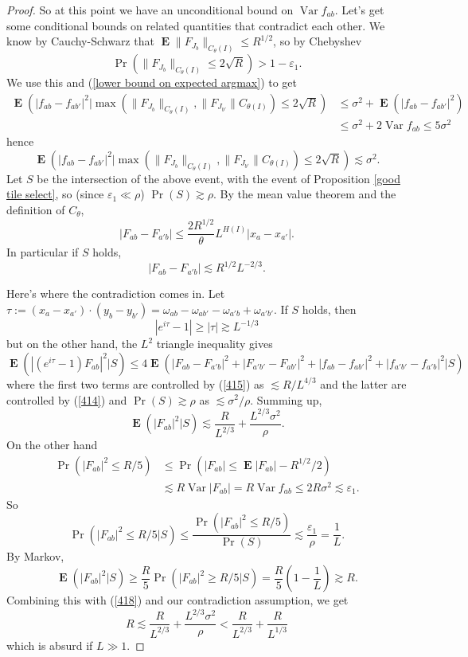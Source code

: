 \documentclass[reqno,12pt]{amsart}
\DeclareMathOperator*{\Expect}{\mathbf E}
\DeclareMathOperator{\Var}{\mathrm{Var}}
\theoremstyle{definition}
\numberwithin{equation}{section}
\begin{document}
\begin{proof}
So at this point we have an unconditional bound on $\Var f_{ab}$.
Let's get some conditional bounds on related quantities that contradict each other.
We know by Cauchy-Schwarz that $\Expect \|F_{J_b}\|_{C_\theta(I)} \leq R^{1/2}$, so by Chebyshev
$$\Pr(\|F_{J_b}\|_{C_\theta(I)} \leq 2\sqrt R) > 1 - \varepsilon_1.$$
We use this and (\ref{lower bound on expected argmax}) to get
\begin{align*}
\Expect(|f_{ab} - f_{ab'}|^2|\max(\|F_{J_b}\|_{C_\theta(I)}, \|F_{J_{b'}}\|C_{\theta(I)}) \leq 2\sqrt R) 
&\leq \sigma^2 + \Expect(|f_{ab} - f_{ab'}|^2) \\
& \leq \sigma^2 + 2 \Var f_{ab} \leq 5\sigma^2
\end{align*}
hence 
\begin{equation}\label{414}
\Expect(|f_{ab} - f_{ab'}|^2|\max(\|F_{J_b}\|_{C_\theta(I)}, \|F_{J_{b'}}\|C_{\theta(I)}) \leq 2\sqrt R) \lesssim \sigma^2.
\end{equation}
Let $S$ be the intersection of the above event, with the event of Proposition \ref{good tile select}, so (since $\varepsilon_1 \ll \rho$) $\Pr(S) \gtrsim \rho$.
By the mean value theorem and the definition of $C_\theta$,
$$|F_{ab} - F_{a'b}| \leq \frac{2R^{1/2}}{\theta} L^{H(I)} |x_a - x_{a'}|.$$
In particular if $S$ holds, 
\begin{equation}\label{415}
|F_{ab} - F_{a'b}| \lesssim R^{1/2} L^{-2/3}.
\end{equation}

Here's where the contradiction comes in.
Let $\tau := (x_a - x_{a'}) \cdot (y_b - y_{b'}) = \omega_{ab} - \omega_{ab'} - \omega_{a'b} + \omega_{a'b'}$.
If $S$ holds, then
$$|e^{i\tau} - 1| \geq |\tau| \gtrsim L^{-1/3}$$
but on the other hand, the $L^2$ triangle inequality gives
$$\Expect(|(e^{i\tau} - 1)F_{ab}|^2|S) \leq 4\Expect(|F_{ab} - F_{a'b}|^2 + |F_{a'b'} - F_{ab'}|^2 + |f_{ab} - f_{ab'}|^2 + |f_{a'b'} - f_{a'b}|^2|S)$$
where the first two terms are controlled by (\ref{415}) as $\lesssim R/L^{4/3}$ and the latter are controlled by (\ref{414}) and $\Pr(S) \gtrsim \rho$ as $\lesssim \sigma^2/\rho$.
Summing up,
\begin{equation}\label{418}
\Expect(|F_{ab}|^2|S) \lesssim \frac{R}{L^{2/3}} + \frac{L^{2/3} \sigma^2}{\rho}.
\end{equation}
On the other hand 
\begin{align*}
\Pr(|F_{ab}|^2 \leq R/5) &\leq \Pr(|F_{ab}| \leq \Expect |F_{ab}| - R^{1/2}/2) \\
&\lesssim R \Var |F_{ab}| = R \Var f_{ab} \leq 2R\sigma^2 \lesssim \varepsilon_1.
\end{align*}
So 
$$\Pr(|F_{ab}|^2 \leq R/5|S) \leq \frac{\Pr(|F_{ab}|^2 \leq R/5)}{\Pr(S)} \lesssim \frac{\varepsilon_1}{\rho} = \frac{1}{L}.$$
By Markov, 
$$\Expect(|F_{ab}|^2|S) \geq \frac{R}{5} \Pr(|F_{ab}|^2 \geq R/5|S) = \frac{R}{5}\left(1 - \frac{1}{L}\right) \gtrsim R.$$
Combining this with (\ref{418}) and our contradiction assumption, we get 
$$R \lesssim \frac{R}{L^{2/3}} + \frac{L^{2/3} \sigma^2}{\rho} < \frac{R}{L^{2/3}} + \frac{R}{L^{1/3}}$$
which is absurd if $L \gg 1$.
\end{proof}
\end{document}
